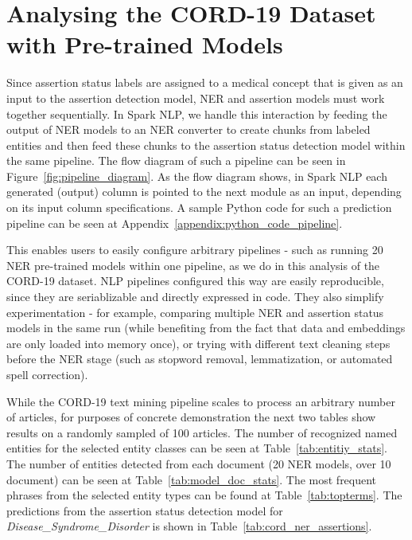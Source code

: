 \documentclass[letterpaper]{article} \usepackage{aaai21}  \usepackage{times}  \usepackage{helvet} \usepackage{courier}  \usepackage[hyphens]{url}  \usepackage{graphicx} \urlstyle{rm} \def\UrlFont{\rm}  \usepackage{natbib}  \usepackage{caption} \frenchspacing  \setlength{\pdfpagewidth}{8.5in}  \setlength{\pdfpageheight}{11in}  \usepackage{lscape}
\begin{document}
\pagebreak

\section{Analysing the CORD-19 Dataset with Pre-trained Models}
\label{sec:parsed_outputs}

Since assertion status labels are assigned to a medical concept that is given as an input to the assertion detection model, NER and assertion models must work together sequentially. In Spark NLP, we handle this interaction by feeding the output of NER models to an NER converter to create chunks from labeled entities and then feed these chunks to the assertion status detection model within the same pipeline. The flow diagram of such a pipeline can be seen in Figure~\ref{fig:pipeline_diagram}. As the flow diagram shows, in Spark NLP each generated (output) column is pointed to the next module as an input, depending on its input column specifications. A sample Python code for such a prediction pipeline can be seen at Appendix~\ref{appendix:python_code_pipeline}.

This enables users to easily configure arbitrary pipelines - such as running 20 NER pre-trained models within one pipeline, as we do in this analysis of the CORD-19 dataset. NLP pipelines configured this way are easily reproducible, since they are seriablizable and directly expressed in code. They also simplify  experimentation - for example, comparing multiple NER and assertion status models in the same run (while benefiting from the fact that data and embeddings are only loaded into memory once), or trying with different text cleaning steps before the NER stage (such as stopword removal, lemmatization, or automated spell correction).

While the CORD-19 text mining pipeline scales to process an arbitrary number of articles, for purposes of concrete demonstration the next two tables show results on a randomly sampled of 100 articles. The number of recognized named entities for the selected entity classes can be seen at Table~\ref{tab:entitiy_stats}.  The number of entities detected from each document (20 NER models, over 10 document) can be seen at Table~\ref{tab:model_doc_stats}. The most frequent phrases from the selected entity types can be found at Table~\ref{tab:topterms}. The predictions from the assertion status detection model for \textit{Disease\_Syndrome\_Disorder} is shown in Table~\ref{tab:cord_ner_assertions}.

\def\rot{\rotatebox}
\end{document}

